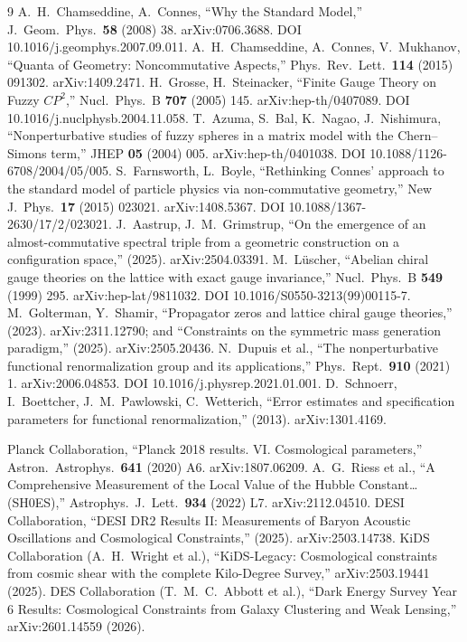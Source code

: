 \documentclass[12pt,a4paper,twoside]{article}
\theoremstyle{plain}
\theoremstyle{definition}
\theoremstyle{remark}
\begin{document}
\begin{thebibliography}{9}
A.~H.~Chamseddine, A.~Connes, ``Why the Standard Model,'' J.\ Geom.\ Phys.\ \textbf{58} (2008) 38. arXiv:0706.3688. DOI 10.1016/j.geomphys.2007.09.011.
A.~H.~Chamseddine, A.~Connes, V.~Mukhanov, ``Quanta of Geometry: Noncommutative Aspects,'' Phys.\ Rev.\ Lett.\ \textbf{114} (2015) 091302. arXiv:1409.2471.
H.~Grosse, H.~Steinacker, ``Finite Gauge Theory on Fuzzy $CP^2$,'' Nucl.\ Phys.\ B \textbf{707} (2005) 145. arXiv:hep-th/0407089. DOI 10.1016/j.nuclphysb.2004.11.058.
T.~Azuma, S.~Bal, K.~Nagao, J.~Nishimura, ``Nonperturbative studies of fuzzy spheres in a matrix model with the Chern--Simons term,'' JHEP \textbf{05} (2004) 005. arXiv:hep-th/0401038. DOI 10.1088/1126-6708/2004/05/005.
S.~Farnsworth, L.~Boyle, ``Rethinking Connes' approach to the standard model of particle physics via non-commutative geometry,'' New J.\ Phys.\ \textbf{17} (2015) 023021. arXiv:1408.5367. DOI 10.1088/1367-2630/17/2/023021.
J.~Aastrup, J.~M.~Grimstrup, ``On the emergence of an almost-commutative spectral triple from a geometric construction on a configuration space,'' (2025). arXiv:2504.03391.
M.~L\"uscher, ``Abelian chiral gauge theories on the lattice with exact gauge invariance,'' Nucl.\ Phys.\ B \textbf{549} (1999) 295. arXiv:hep-lat/9811032. DOI 10.1016/S0550-3213(99)00115-7.
M.~Golterman, Y.~Shamir, ``Propagator zeros and lattice chiral gauge theories,'' (2023). arXiv:2311.12790; and ``Constraints on the symmetric mass generation paradigm,'' (2025). arXiv:2505.20436.
N.~Dupuis et al., ``The nonperturbative functional renormalization group and its applications,'' Phys.\ Rept.\ \textbf{910} (2021) 1. arXiv:2006.04853. DOI 10.1016/j.physrep.2021.01.001.
D.~Schnoerr, I.~Boettcher, J.~M.~Pawlowski, C.~Wetterich, ``Error estimates and specification parameters for functional renormalization,'' (2013). arXiv:1301.4169.

Planck Collaboration, ``Planck 2018 results. VI. Cosmological parameters,'' Astron.\ Astrophys.\ \textbf{641} (2020) A6. arXiv:1807.06209.
A.~G.~Riess et al., ``A Comprehensive Measurement of the Local Value of the Hubble Constant\ldots (SH0ES),'' Astrophys.\ J.\ Lett.\ \textbf{934} (2022) L7. arXiv:2112.04510.
DESI Collaboration, ``DESI DR2 Results II: Measurements of Baryon Acoustic Oscillations and Cosmological Constraints,'' (2025). arXiv:2503.14738.
KiDS Collaboration (A.~H.~Wright et al.), ``KiDS-Legacy: Cosmological constraints from cosmic shear with the complete Kilo-Degree Survey,'' arXiv:2503.19441 (2025).
DES Collaboration (T.~M.~C.~Abbott et al.), ``Dark Energy Survey Year 6 Results: Cosmological Constraints from Galaxy Clustering and Weak Lensing,'' arXiv:2601.14559 (2026).

\end{thebibliography}
\end{document}
